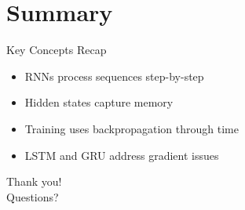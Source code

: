 \documentclass{beamer}
\begin{document}
\section{Summary}
\begin{frame}{Key Concepts Recap}
\begin{itemize}
    \item RNNs process sequences step-by-step
    \item Hidden states capture memory
    \item Training uses backpropagation through time
    \item LSTM and GRU address gradient issues
\end{itemize}
\end{frame}

\begin{frame}[standout]
    Thank you! \\
    Questions?
\end{frame}
\end{document}
